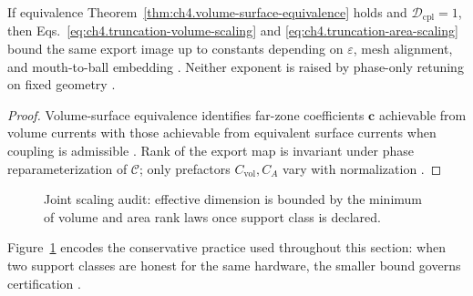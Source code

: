 \begin{proposition}
\label{prop:ch4.truncation-scaling-consistency}
If equivalence Theorem~\ref{thm:ch4.volume-surface-equivalence} holds and \(\mathcal{D}_{\mathrm{cpl}}=1\), then
Eqs.~\eqref{eq:ch4.truncation-volume-scaling} and \eqref{eq:ch4.truncation-area-scaling} bound the same export image up to constants
depending on \(\varepsilon\), mesh alignment, and mouth-to-ball embedding \cite{stratton1941,harrington2001,collin2001}. Neither exponent
is raised by phase-only retuning on fixed geometry \cite{devaney2004,hansen1988}.
\end{proposition}
\begin{proof}
Volume-surface equivalence identifies far-zone coefficients \(\mathbf{c}\) achievable from volume currents with those achievable from
equivalent surface currents when coupling is admissible \cite{stratton1941,harrington2001}. Rank of the export map is invariant under
phase reparameterization of \(\mathcal{C}\); only prefactors \(C_{\mathrm{vol}},C_{A}\) vary with normalization \cite{hansen1988,devaney2004}.
\end{proof}

\begin{figure}[t]
\centering
{}
\caption{Joint scaling audit: effective dimension is bounded by the minimum of volume and area rank laws once support class is declared.}
\label{fig:ch4.joint-scaling-audit}
\end{figure}

Figure~\ref{fig:ch4.joint-scaling-audit} encodes the conservative practice used throughout this section: when two support classes are
honest for the same hardware, the smaller bound governs certification \cite{hansen1988,stratton1941,collin2001}.

